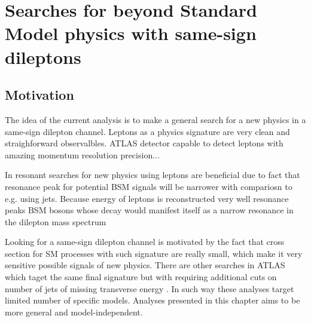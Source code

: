 \chapter{Searches for beyond Standard Model physics with same-sign dileptons}
\label{chap:SS}
\section{Motivation}


The idea of the current analysis is to make a general search for a new physics in a same-sign dilepton channel. \toFix
Leptons as a physics signature are very clean and straighforward observalbles. 
ATLAS detector capable to detect leptons with amazing momentum resolution precision... 

In resonant searches for new physics using leptons are beneficial due to fact that resonance peak for potential BSM signals will be narrower with compariosn to e.g. using jets.
Because energy of leptons is reconstructed very well resonance peaks 
BSM bosons whose decay would manifest itself as a narrow resonance in the dilepton mass spectrum

Looking for a same-sign dilepton channel is motivated by the fact that cross section for SM processes with such signature are really small, which make 
it very sensitive possible signals of new physics.  \toFix
There are other searches in ATLAS which taget the same final signature but with requiring additional cuts on number of jets \toFix[link] of missing transverse energy \toFix[link].
In such way these analyses target limited number of specific models.
Analyses presented in this chapter aims to be more general and model-independent. 

